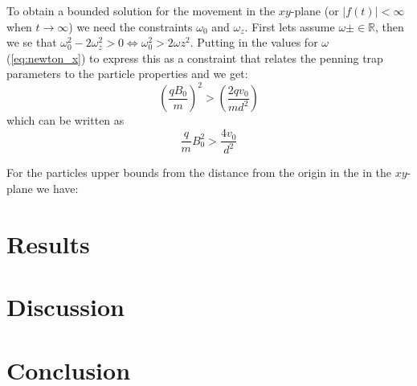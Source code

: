 \documentclass[english,notitlepage,reprint,nofootinbib]{revtex4-1}  %
\begin{document}
	To obtain a bounded solution for the movement in the $xy$-plane (or $|f(t)| < \infty$ when $t\to\infty$) we need the constraints $\omega_0$ and $\omega_z$. First lets assume $\omega \pm \in \mathbb{R}$, then we se that
	$\omega_0^2 - 2 \omega_z^2 > 0 \Leftrightarrow \omega_0^2 > 2 \omega z^2$.
	Putting in the values for $\omega$ (\ref{eq:newton_x}) to express this as a constraint that relates the penning trap parameters to the particle properties and we get:
	\begin{equation*}
		\left( \frac{q B_0}{m} \right) ^2 > \left( \frac{2 q v_0}{m d^2} \right)
	\end{equation*}
	which can be written as
	\begin{equation*}
		\frac{q}{m} B_0^2 > \frac{4 v_0}{d^2} 
	\end{equation*}

    For the particles upper bounds from the distance from the origin in the in the $xy$-plane we have:

















	
	
	\section{Results}\label{sec:results}
	
	
	\section{Discussion}\label{sec:discussion}
	
	
	\section{Conclusion}\label{sec:conclusion}
	
	\onecolumngrid
	
	
	
	
\end{document}
